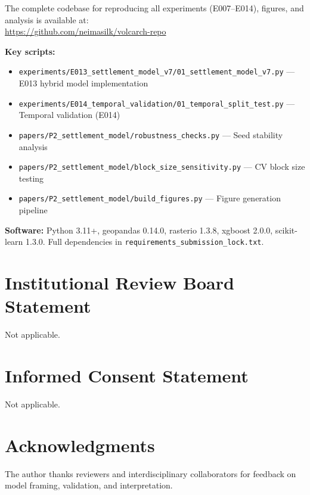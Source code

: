 \documentclass[12pt]{article}
\begin{document}
The complete codebase for reproducing all experiments (E007--E014), figures, and analysis is available at:\\ \url{https://github.com/neimasilk/volcarch-repo}

\textbf{Key scripts:}
\begin{itemize}
  \item \texttt{experiments/E013\_settlement\_model\_v7/01\_settlement\_model\_v7.py} — E013 hybrid model implementation
  \item \texttt{experiments/E014\_temporal\_validation/01\_temporal\_split\_test.py} — Temporal validation (E014)
  \item \texttt{papers/P2\_settlement\_model/robustness\_checks.py} — Seed stability analysis
  \item \texttt{papers/P2\_settlement\_model/block\_size\_sensitivity.py} — CV block size testing
  \item \texttt{papers/P2\_settlement\_model/build\_figures.py} — Figure generation pipeline
\end{itemize}

\textbf{Software:} Python 3.11+, geopandas 0.14.0, rasterio 1.3.8, xgboost 2.0.0, scikit-learn 1.3.0. Full dependencies in \texttt{requirements\_submission\_lock.txt}.

\section*{Institutional Review Board Statement}

Not applicable.

\section*{Informed Consent Statement}

Not applicable.

\section*{Acknowledgments}

The author thanks reviewers and interdisciplinary collaborators for feedback on model framing, validation, and interpretation.



\end{document}
